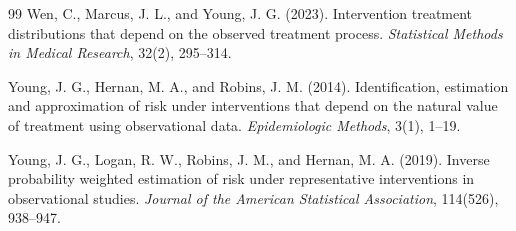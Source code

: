 \documentclass[11pt]{article}
\theoremstyle{definition}
\theoremstyle{plain}
\theoremstyle{remark}
\begin{document}
\begin{thebibliography}{99}
Wen, C., Marcus, J. L., and Young, J. G. (2023).
Intervention treatment distributions that depend on the observed treatment process.
\emph{Statistical Methods in Medical Research}, 32(2), 295--314.

Young, J. G., Hernan, M. A., and Robins, J. M. (2014).
Identification, estimation and approximation of risk under interventions that depend on the natural value of treatment using observational data.
\emph{Epidemiologic Methods}, 3(1), 1--19.

Young, J. G., Logan, R. W., Robins, J. M., and Hernan, M. A. (2019).
Inverse probability weighted estimation of risk under representative interventions in observational studies.
\emph{Journal of the American Statistical Association}, 114(526), 938--947.
\end{thebibliography}
\end{document}
